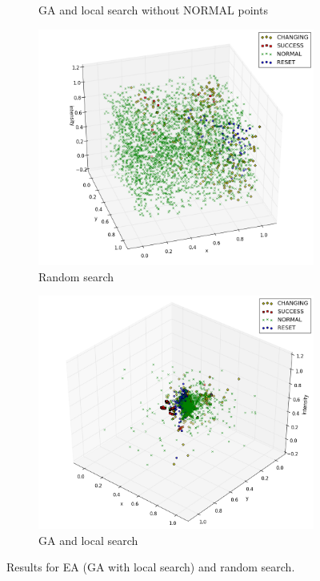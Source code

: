 \documentclass[times, utf8, diplomski]{fer}
\begin{document}
\begin{figure}
\begin{subfigure}[b]{0.49\textwidth}
		\caption{GA and local search without NORMAL points}
		\label{fig:ga2}
	\end{subfigure}
	\begin{subfigure}[b]{0.49\textwidth}
		\includegraphics[width=0.98\linewidth]{images/plots/plot_random_3D.png}
		\caption{Random search}
		\label{fig:random3}
	\end{subfigure}
	\begin{subfigure}[b]{0.49\textwidth}
		\includegraphics[width=0.98\linewidth]{images/plots/plot_GA_3_3D.png}
		\caption{GA and local search}
		\label{fig:ga3}
	\end{subfigure}
	\label{fig:figures}
	\caption{Results for EA (GA with local search) and random search.}
\end{figure}
\end{document}
